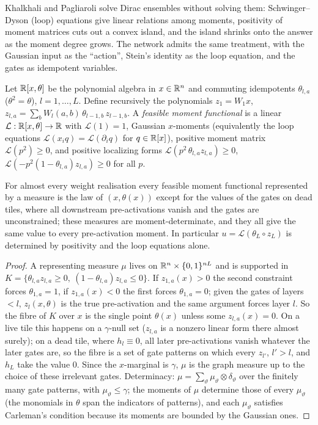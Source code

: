 \label{sec:bootstrap}
Khalkhali and Pagliaroli \cite{KP} solve Dirac ensembles without solving them: Schwinger--Dyson (loop) equations give
linear relations among moments, positivity of moment matrices cuts out a convex island, and the island shrinks onto
the answer as the moment degree grows. The network admits the same treatment, with the Gaussian input as the
``action'', Stein's identity as the loop equation, and the gates as idempotent variables.

\begin{definition}\label{def:moment}
Let $\mathbb R[x,\theta]$ be the polynomial algebra in $x\in\mathbb R^n$ and commuting idempotents $\theta_{l,a}$ ($\theta^2=\theta$),
$l=1,\dots,L$. Define recursively the polynomials $z_1=W_1x$, $z_{l,a}=\sum_bW_l(a,b)\,\theta_{l-1,b}\,z_{l-1,b}$. A
\emph{feasible moment functional} is a linear $\mathcal L:\mathbb R[x,\theta]\to\mathbb R$ with $\mathcal L(1)=1$, Gaussian
$x$-moments (equivalently the loop equations $\mathcal L(x_iq)=\mathcal L(\partial_iq)$ for $q\in\mathbb R[x]$), positive moment
matrix $\mathcal L(p^2)\ge0$, and positive localizing forms $\mathcal L(p^2\,\theta_{l,a}z_{l,a})\ge0$,
$\mathcal L(-p^2(1-\theta_{l,a})z_{l,a})\ge0$ for all $p$.
\end{definition}

\begin{theorem}\label{thm:island}
For almost every weight realisation every feasible moment functional represented by a measure is the law of
$(x,\theta(x))$ except for the values of the gates on dead tiles, where all downstream pre-activations vanish and the
gates are unconstrained; these measures are moment-determinate, and they all give the same value to every
pre-activation moment. In particular $u=\mathcal L(\theta_L\circ z_L)$ is determined by positivity and the loop
equations alone.
\end{theorem}
\begin{proof}
A representing measure $\mu$ lives on $\mathbb R^n\times\{0,1\}^{nL}$ and is supported in
$K=\{\theta_{l,a}z_{l,a}\ge0,\ (1-\theta_{l,a})z_{l,a}\le0\}$. If $z_{1,a}(x)>0$ the second constraint forces
$\theta_{1,a}=1$, if $z_{1,a}(x)<0$ the first forces $\theta_{1,a}=0$; given the gates of layers $<l$, $z_l(x,\theta)$ is the
true pre-activation and the same argument forces layer $l$. So the fibre of $K$ over $x$ is the single point $\theta(x)$
unless some $z_{l,a}(x)=0$. On a live tile this happens on a $\gamma$-null set ($z_{l,a}$ is a nonzero linear form there
almost surely); on a dead tile, where $h_l\equiv0$, all later pre-activations vanish whatever the later gates are, so
the fibre is a set of gate patterns on which every $z_{l'}$, $l'>l$, and $h_L$ take the value $0$. Since the $x$-marginal
is $\gamma$, $\mu$ is the graph measure up to the choice of these irrelevant gates. Determinacy: $\mu=\sum_\vartheta\mu_\vartheta\otimes\delta_\vartheta$
over the finitely many gate patterns, with $\mu_\vartheta\le\gamma$; the moments of $\mu$ determine those of every $\mu_\vartheta$
(the monomials in $\theta$ span the indicators of patterns), and each $\mu_\vartheta$ satisfies Carleman's condition because its
moments are bounded by the Gaussian ones.
\end{proof}

